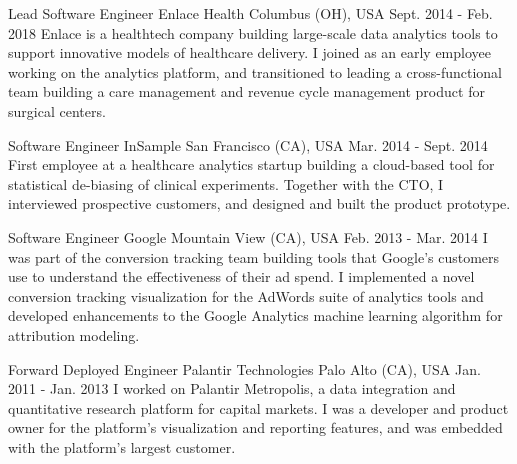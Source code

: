 \begin{cventries}
  \cventry
    {Lead Software Engineer} %
    {Enlace Health} %
    {Columbus (OH), USA} %
    {Sept. 2014 - Feb. 2018} %
    {
      Enlace is a healthtech company building large-scale data analytics tools to support innovative models of healthcare delivery. I joined as an early employee working on the analytics platform, and transitioned to leading a cross-functional team building a care management and revenue cycle management product for surgical centers.
    }

  \cventry
    {Software Engineer} %
    {InSample} %
    {San Francisco (CA), USA} %
    {Mar. 2014 - Sept. 2014} %
    {
      First employee at a healthcare analytics startup building a cloud-based tool for statistical de-biasing of clinical experiments. Together with the CTO, I interviewed prospective customers, and designed and built the product prototype.
      \vspace{3.0mm}
    }

  \cventry
    {Software Engineer} %
    {Google} %
    {Mountain View (CA), USA} %
    {Feb. 2013 - Mar. 2014} %
    {
      I was part of the conversion tracking team building tools that Google's customers use to understand the effectiveness of their ad spend. I implemented a novel conversion tracking visualization for the AdWords suite of analytics tools and developed enhancements to the Google Analytics machine learning algorithm for attribution modeling.
      \vspace{3.0mm}
    }

  \cventry
    {Forward Deployed Engineer} %
    {Palantir Technologies} %
    {Palo Alto (CA), USA} %
    {Jan. 2011 - Jan. 2013} %
    {
      I worked on Palantir Metropolis, a data integration and quantitative research platform for capital markets. I was a developer and product owner for the platform's visualization and reporting features, and was embedded with the platform's largest customer.
    }

\end{cventries}
